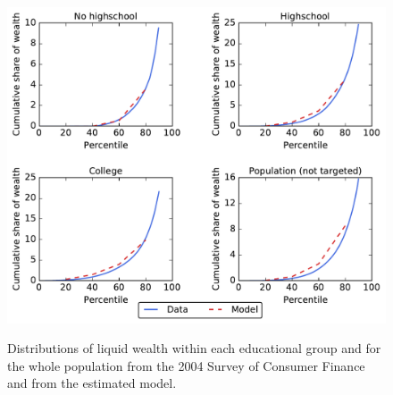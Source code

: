 \documentclass[11pt]{article}
\begin{document}
\begin{figure}[th]
	\begin{center}
	\includegraphics[width=.9\textwidth]{LorenzPoints}
	\label{fig:LorenzPts}
	\caption{Distributions of liquid wealth within each educational group and for the whole population from the 2004 Survey of Consumer Finance and from the estimated model.}
	\end{center}
\end{figure}

\let\bibfont=\small
%


\end{document}
